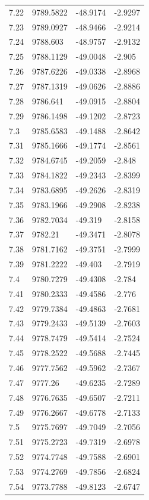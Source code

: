\begin{table}[H]
\begin{tabular}{llll}
7.22 & 9789.5822 & -48.9174 & -2.9297 \\
7.23 & 9789.0927 & -48.9466 & -2.9214 \\
7.24 & 9788.603 & -48.9757 & -2.9132 \\
7.25 & 9788.1129 & -49.0048 & -2.905 \\
7.26 & 9787.6226 & -49.0338 & -2.8968 \\
7.27 & 9787.1319 & -49.0626 & -2.8886 \\
7.28 & 9786.641 & -49.0915 & -2.8804 \\
7.29 & 9786.1498 & -49.1202 & -2.8723 \\
7.3 & 9785.6583 & -49.1488 & -2.8642 \\
7.31 & 9785.1666 & -49.1774 & -2.8561 \\
7.32 & 9784.6745 & -49.2059 & -2.848 \\
7.33 & 9784.1822 & -49.2343 & -2.8399 \\
7.34 & 9783.6895 & -49.2626 & -2.8319 \\
7.35 & 9783.1966 & -49.2908 & -2.8238 \\
7.36 & 9782.7034 & -49.319 & -2.8158 \\
7.37 & 9782.21 & -49.3471 & -2.8078 \\
7.38 & 9781.7162 & -49.3751 & -2.7999 \\
7.39 & 9781.2222 & -49.403 & -2.7919 \\
7.4 & 9780.7279 & -49.4308 & -2.784 \\
7.41 & 9780.2333 & -49.4586 & -2.776 \\
7.42 & 9779.7384 & -49.4863 & -2.7681 \\
7.43 & 9779.2433 & -49.5139 & -2.7603 \\
7.44 & 9778.7479 & -49.5414 & -2.7524 \\
7.45 & 9778.2522 & -49.5688 & -2.7445 \\
7.46 & 9777.7562 & -49.5962 & -2.7367 \\
7.47 & 9777.26 & -49.6235 & -2.7289 \\
7.48 & 9776.7635 & -49.6507 & -2.7211 \\
7.49 & 9776.2667 & -49.6778 & -2.7133 \\
7.5 & 9775.7697 & -49.7049 & -2.7056 \\
7.51 & 9775.2723 & -49.7319 & -2.6978 \\
7.52 & 9774.7748 & -49.7588 & -2.6901 \\
7.53 & 9774.2769 & -49.7856 & -2.6824 \\
7.54 & 9773.7788 & -49.8123 & -2.6747 \\

\end{tabular}
\end{table}
